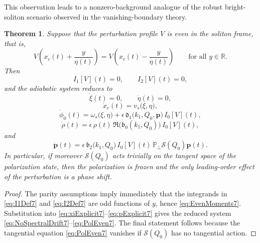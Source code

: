 \documentclass[11pt]{amsart}
\newtheorem{theorem}{Theorem}[section]
\theoremstyle{definition}
\numberwithin{equation}{section}
\begin{document}
This observation leads to a nonzero-background analogue of the robust bright-soliton scenario observed in the vanishing-boundary theory.

\begin{theorem}
\label{thm_8_1}
Suppose that the perturbation profile \(V\) is even in the soliton frame, that is,
\begin{equation}
V\!\left(x_c(t)+\frac{y}{\eta(t)}\right)=V\!\left(x_c(t)-\frac{y}{\eta(t)}\right)
\qquad\text{for all }y\in\mathbb R.
\label{eq:EvenCondition7}
\end{equation}
Then
\begin{equation}
I_1[V](t)=0,
\qquad
I_2[V](t)=0,
\label{eq:EvenMoments7}
\end{equation}
and the adiabatic system reduces to
\begin{equation}
\dot{\xi}(t)=0,
\qquad
\dot{\eta}(t)=0,
\label{eq:NoSpectralDrift7}
\end{equation}
\begin{equation}
\dot{x}_c(t)=v_s\bigl(\xi,\eta\bigr),
\label{eq:NoCenterCorrection7}
\end{equation}
\begin{equation}
\dot{\phi}_0(t)=\omega_s\bigl(\xi,\eta\bigr)+\epsilon\,\mathfrak{d}_1\bigl(k_1,Q_0,\mathbf p\bigr)\,I_0[V](t),
\label{eq:OnlyPhaseShift7}
\end{equation}
\begin{equation}
\dot{\rho}(t)=\epsilon\,\rho(t)\,\Re\!\bigl(\mathfrak b_0(k_1,Q_0)\bigr)\,I_0[V](t),
\label{eq:RhoEven7}
\end{equation}
and
\begin{equation}
\dot{\mathbf p}(t)
=
\epsilon\,\mathfrak b_2\bigl(k_1,Q_0\bigr)\,I_0[V](t)\,
\mathbb P_\perp \mathcal S(Q_0)\mathbf p(t).
\label{eq:PolEven7}
\end{equation}
In particular, if moreover $\mathcal S(Q_0)$ acts trivially on the tangent space of the polarization state, then the polarization is frozen and the only leading-order effect of the perturbation is a phase shift.
\end{theorem}

\begin{proof}
The parity assumptions imply immediately that the integrands in \eqref{eq:I1Def7} and \eqref{eq:I2Def7} are odd functions of $y$, hence \eqref{eq:EvenMoments7}. Substitution into \eqref{eq:xiExplicit7}--\eqref{eq:pExplicit7} gives the reduced system \eqref{eq:NoSpectralDrift7}--\eqref{eq:PolEven7}. The final statement follows because the tangential equation \eqref{eq:PolEven7} vanishes if $\mathcal S(Q_0)$ has no tangential action.
\end{proof}
\end{document}
